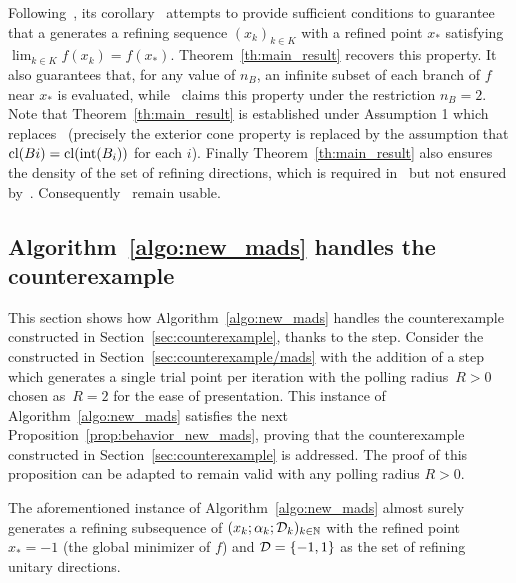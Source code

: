 Following~\cite[Theorem~4.1]{ViCu2012}, its corollary~\cite[Corollary~4.1]{ViCu2012} attempts to provide sufficient conditions to guarantee that a \ddsm generates a refining sequence $(x_k)_{k \in K}$ with a refined point $x_*$ satisfying~$\lim_{k \in K} f(x_k) = f(x_*)$.
Theorem~\ref{th:main_result} recovers this property.
It also guarantees that, for any value of $n_B$, an infinite subset of each branch of $f$ near $x_*$ is evaluated, while~\cite[Corollary~4.1]{ViCu2012} claims this property under the restriction $n_B = 2$.
Note that Theorem~\ref{th:main_result} is established under Assumption 1 which replaces~\cite[Assumption~4.1]{ViCu2012} (precisely the exterior cone property is replaced by the assumption that $\mathrm{cl}(Bi) = \mathrm{cl}(\mathrm{int}(B_i))$ for each $i$).
Finally Theorem~\ref{th:main_result} also ensures the density of the set of refining directions, which is required in~\cite[Theorem~3.2]{ViCu2012} but not ensured by~\cite[Corollary~4.1]{ViCu2012}.
Consequently~\cite[Theorems~3.1 and~3.2]{ViCu2012} remain usable.



\subsection{Algorithm~\ref{algo:new_mads} handles the counterexample}

This section shows how Algorithm~\ref{algo:new_mads} handles the counterexample constructed in Section~\ref{sec:counterexample}, thanks to the \revpoll step.
Consider the \ddsm constructed in Section~\ref{sec:counterexample/mads} with the addition of a \revpoll step which generates a single trial point per iteration with the polling radius~$R > 0$ chosen as~$R = 2$ for the ease of presentation.
This instance of Algorithm~\ref{algo:new_mads} satisfies the next Proposition~\ref{prop:behavior_new_mads}, proving that the counterexample constructed in Section~\ref{sec:counterexample} is addressed.
The proof of this proposition can be adapted to remain valid with any polling radius $R > 0$.

\vspace{0.1cm}

\begin{proposition}
	\label{prop:behavior_new_mads}
	The aforementioned instance of Algorithm~\ref{algo:new_mads} almost surely generates a refining subsequence of $(x_k;\alpha_k;\mathcal{D}_k)_{k\in\mathbb{N}}$ with the refined point $x_* = -1$ (the global minimizer of $f$) and $\mathcal{D} = \{-1,1\}$ as the set of refining unitary directions.
\end{proposition}

